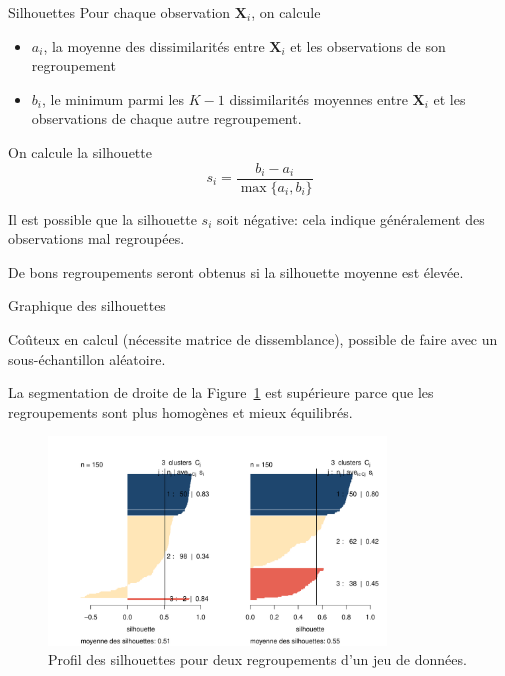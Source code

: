 \documentclass[
  ignorenonframetext,
]{beamer}
\providecommand{\tightlist}{%
  \setlength{\itemsep}{0pt}\setlength{\parskip}{0pt}}\usepackage{longtable,booktabs,array}
\begin{document}
\begin{frame}{Silhouettes}
\protect\hypertarget{silhouettes}{}
Pour chaque observation \(\mathbf{X}_i\), on calcule

\begin{itemize}
\tightlist
\item
  \(a_i\), la moyenne des dissimilarités entre \(\mathbf{X}_i\) et les
  observations de son regroupement
\item
  \(b_i\), le minimum parmi les \(K-1\) dissimilarités moyennes entre
  \(\mathbf{X}_i\) et les observations de chaque autre regroupement.
\end{itemize}

On calcule la silhouette \[s_i=\frac{b_i-a_i}{\max\{a_i, b_i\}}\]

Il est possible que la silhouette \(s_i\) soit négative: cela indique
généralement des observations mal regroupées.

De bons regroupements seront obtenus si la silhouette moyenne est
élevée.
\end{frame}

\begin{frame}{Graphique des silhouettes}
\protect\hypertarget{graphique-des-silhouettes}{}
\footnotesize

Coûteux en calcul (nécessite matrice de dissemblance), possible de faire
avec un sous-échantillon aléatoire.

La segmentation de droite de la Figure~\ref{fig-silhouette} est
supérieure parce que les regroupements sont plus homogènes et mieux
équilibrés.

\begin{figure}

{\centering \includegraphics[width=0.8\textwidth,height=\textheight]{MATH60602-diapos11_files/figure-beamer/fig-silhouette-1.pdf}

}

\caption{\label{fig-silhouette}Profil des silhouettes pour deux
regroupements d'un jeu de données.}

\end{figure}
\end{frame}
\end{document}
